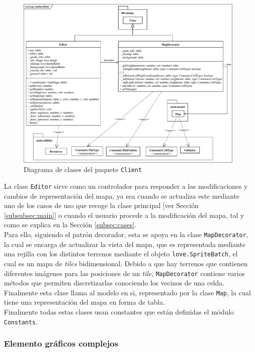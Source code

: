 \begin{figure}[!h]
	\centering
	\includegraphics[width=\textwidth]{images/clase-editor.pdf}
	\caption{Diagrama de clases del paquete \texttt{Client}}
	\label{fig:editorclass}
\end{figure}

La clase \texttt{Editor} sirve como un controlador para responder a las modificaciones y cambios de representación del mapa, ya sea cuando se actualiza este mediante uno de los casos de uso que recoge la clase principal [ver Sección \ref{subsubsec:main}] o cuando el usuario procede a la modificación del mapa, tal y como se explica en la Sección \ref{subsec:cases}. \\

Para ello, siguiendo el patrón decorador, esta se apoya en la clase \texttt{MapDecorator}, la cual se encarga de actualizar la vista del mapa, que es representada mediante una rejilla con los distintos terrenos mediante el objeto \texttt{love.SpriteBatch}, el cual es un mapa de \textit{tiles} bidimensional. Debido a que hay terrenos que contienen diferentes imágenes para las posiciones de un \textit{tile}, \texttt{MapDecorator} contiene varios métodos que permiten discretizarlas conociendo los vecinos de una celda. Finalmente esta clase llama al modelo en si, representado por la clase \texttt{Map}, la cual tiene una representación del mapa en forma de tabla. \\

Finalmente todas estas clases usan constantes que están definidas el módulo \texttt{Constants}.

\subsubsection{Elemento gráficos complejos}
\label{subsubsec:widgets}

